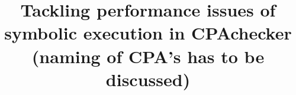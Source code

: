 \documentclass[a4paper,11pt]{article}
\begin{document}
\title{Tackling performance issues of symbolic execution in CPAchecker (naming of CPA's has to be discussed)}
\maketitle
\setcounter{tocdepth}{5}
\setcounter{secnumdepth}{5}
\tableofcontents
\begin{abstract}
\end{abstract}













\end{document}
